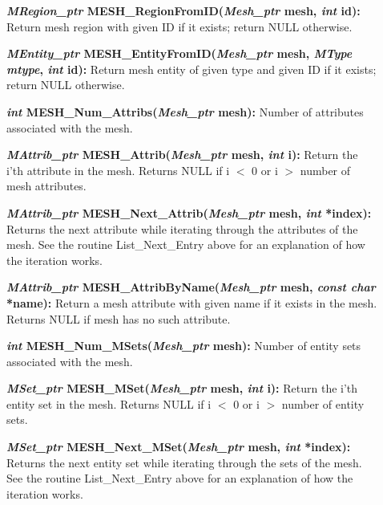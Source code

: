\documentclass[12pt]{article}
\begin{document}
\begin{description}
\item[]{\bf {\em MRegion\_ptr}
    MESH\_RegionFromID({\em Mesh\_ptr} mesh, {\em int} id):}
  Return mesh region with given ID if it exists; return NULL
  otherwise.

\item[]{\bf {\em MEntity\_ptr} MESH\_EntityFromID({\em Mesh\_ptr}
    mesh, {\em MType mtype}, {\em int} id):} Return mesh entity of
  given type and given ID if it exists; return NULL otherwise.

\item[]

\item[]{\bf {\em int} MESH\_Num\_Attribs({\em Mesh\_ptr}
    mesh):} Number of attributes associated with the mesh.
  
\item[]{\bf {\em MAttrib\_ptr} MESH\_Attrib({\em Mesh\_ptr}
    mesh, {\em int} i):} Return the i'th attribute in the mesh.
  Returns NULL if i $<$ 0 or i $>$ number of mesh attributes.
 
\item[]{\bf {\em MAttrib\_ptr}
    MESH\_Next\_Attrib({\em Mesh\_ptr} mesh, {\em int} *index):}
  Returns the next attribute while iterating through the attributes of
  the mesh. See the routine List\_Next\_Entry above for an explanation
  of how the iteration works.
  
\item[]{\bf {\em MAttrib\_ptr}
    MESH\_AttribByName({\em Mesh\_ptr} mesh, {\em const char}
    *name):} Return a mesh attribute with given name if it exists in
  the mesh. Returns NULL if mesh has no such attribute.

\item[]
  
\item[]{\bf {\em int} MESH\_Num\_MSets({\em Mesh\_ptr}
    mesh):} Number of entity sets associated with the mesh.
  
\item[]{\bf {\em MSet\_ptr} MESH\_MSet({\em Mesh\_ptr}
    mesh, {\em int} i):} Return the i'th entity set in the mesh.
  Returns NULL if i $<$ 0 or i $>$ number of entity sets.
 
\item[]{\bf {\em MSet\_ptr}
    MESH\_Next\_MSet({\em Mesh\_ptr} mesh, {\em int} *index):}
  Returns the next entity set while iterating through the sets of
  the mesh. See the routine List\_Next\_Entry above for an explanation
  of how the iteration works.
  

\end{description}
\end{document}

